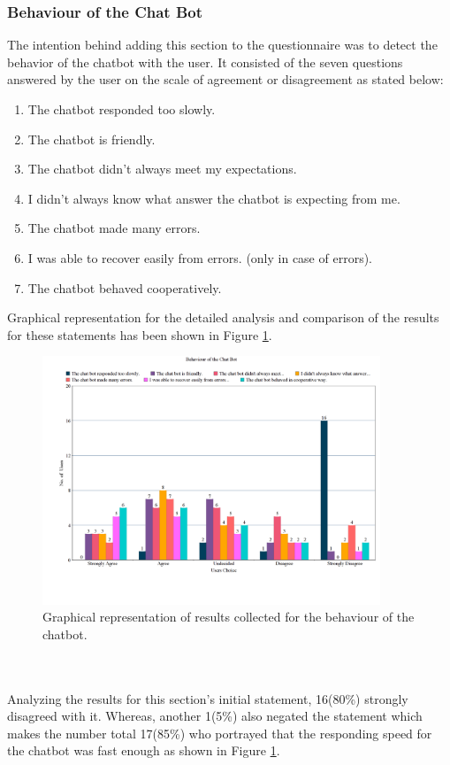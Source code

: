 \subsubsection*{Behaviour of the Chat Bot}
The intention behind adding this section to the questionnaire was to detect the behavior of the chatbot with the user. It consisted of the seven questions answered by the user on the scale of agreement or disagreement as stated below: 
\begin{enumerate}
    \item The chatbot responded too slowly.
    \item The chatbot is friendly.
    \item The chatbot didn't always meet my expectations.
    \item I didn't always know what answer the chatbot is expecting from me.
    \item The chatbot made many errors.
    \item I was able to recover easily from errors. (only in case of errors).
    \item The chatbot behaved cooperatively.
\end{enumerate}
Graphical representation for the detailed analysis and comparison of the results for these statements has been shown in Figure \ref{fig:behavofBot}.

\begin{figure}[!h]
    \centering
    \includegraphics[width=0.9\textwidth]{img/Behaviour_of_the_Chat_Bot_Updated.png}
    \caption{Graphical representation of results collected for the behaviour of the chatbot.}
    \label{fig:behavofBot}
\end{figure}
\\~\\
Analyzing the results for this section's initial statement, 16(80\%) strongly disagreed with it. Whereas, another 1(5\%) also negated the statement which makes the number total 17(85\%) who portrayed that the responding speed for the chatbot was fast enough as shown in Figure \ref{fig:behavofBot}. 


